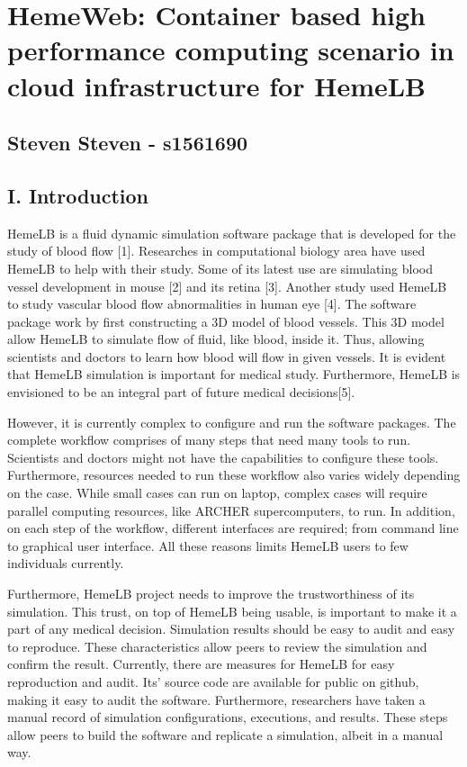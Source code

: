 \documentclass[]{article}
\date{}
\begin{document}
\section{HemeWeb: Container based high performance computing scenario in
cloud infrastructure for
HemeLB}\label{hemeweb-container-based-high-performance-computing-scenario-in-cloud-infrastructure-for-hemelb}

\subsection{Steven Steven - s1561690}\label{steven-steven---s1561690}

\subsection{I. Introduction}\label{i.-introduction}

HemeLB is a fluid dynamic simulation software package that is developed
for the study of blood flow {[}1{]}. Researches in computational biology
area have used HemeLB to help with their study. Some of its latest use
are simulating blood vessel development in mouse {[}2{]} and its retina
{[}3{]}. Another study used HemeLB to study vascular blood flow
abnormalities in human eye {[}4{]}. The software package work by first
constructing a 3D model of blood vessels. This 3D model allow HemeLB to
simulate flow of fluid, like blood, inside it. Thus, allowing scientists
and doctors to learn how blood will flow in given vessels. It is evident
that HemeLB simulation is important for medical study. Furthermore,
HemeLB is envisioned to be an integral part of future medical
decisions{[}5{]}.

However, it is currently complex to configure and run the software
packages. The complete workflow comprises of many steps that need many
tools to run. Scientists and doctors might not have the capabilities to
configure these tools. Furthermore, resources needed to run these
workflow also varies widely depending on the case. While small cases can
run on laptop, complex cases will require parallel computing resources,
like ARCHER supercomputers, to run. In addition, on each step of the
workflow, different interfaces are required; from command line to
graphical user interface. All these reasons limits HemeLB users to few
individuals currently.

Furthermore, HemeLB project needs to improve the trustworthiness of its
simulation. This trust, on top of HemeLB being usable, is important to
make it a part of any medical decision. Simulation results should be
easy to audit and easy to reproduce. These characteristics allow peers
to review the simulation and confirm the result. Currently, there are
measures for HemeLB for easy reproduction and audit. Its' source code
are available for public on github, making it easy to audit the
software. Furthermore, researchers have taken a manual record of
simulation configurations, executions, and results. These steps allow
peers to build the software and replicate a simulation, albeit in a
manual way.
\end{document}
